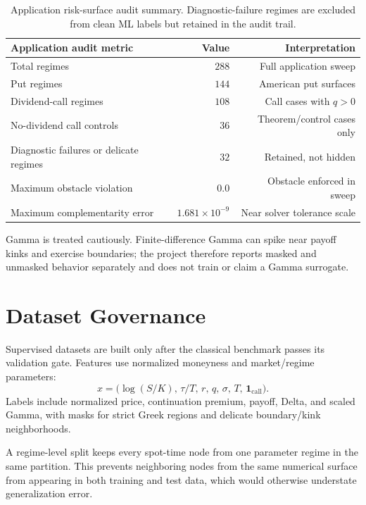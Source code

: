 \documentclass[11pt]{article}
\begin{document}
\begin{table}[h]
\centering
\small
\begin{tabular}{lrr}
\toprule
Application audit metric & Value & Interpretation \\
\midrule
Total regimes & $288$ & Full application sweep \\
Put regimes & $144$ & American put surfaces \\
Dividend-call regimes & $108$ & Call cases with $q>0$ \\
No-dividend call controls & $36$ & Theorem/control cases only \\
Diagnostic failures or delicate regimes & $32$ & Retained, not hidden \\
Maximum obstacle violation & $0.0$ & Obstacle enforced in sweep \\
Maximum complementarity error & $1.681\times10^{-9}$ & Near solver tolerance scale \\
\bottomrule
\end{tabular}
\caption{Application risk-surface audit summary. Diagnostic-failure regimes are excluded from clean ML labels but retained in the audit trail.}
\label{tab:application}
\end{table}

Gamma is treated cautiously. Finite-difference Gamma can spike near payoff kinks and exercise boundaries; the project therefore reports masked and unmasked behavior separately and does not train or claim a Gamma surrogate.

\section{Dataset Governance}
Supervised datasets are built only after the classical benchmark passes its validation gate. Features use normalized moneyness and market/regime parameters:
\begin{equation}
  x = \bigl(\log(S/K),\, \tau/T,\, r,\, q,\, \sigma,\, T,\, \mathbf{1}_{\mathrm{call}}\bigr).
\end{equation}
Labels include normalized price, continuation premium, payoff, Delta, and scaled Gamma, with masks for strict Greek regions and delicate boundary/kink neighborhoods.

A regime-level split keeps every spot-time node from one parameter regime in
the same partition. This prevents neighboring nodes from the same numerical
surface from appearing in both training and test data, which would otherwise
understate generalization error.
\end{document}
